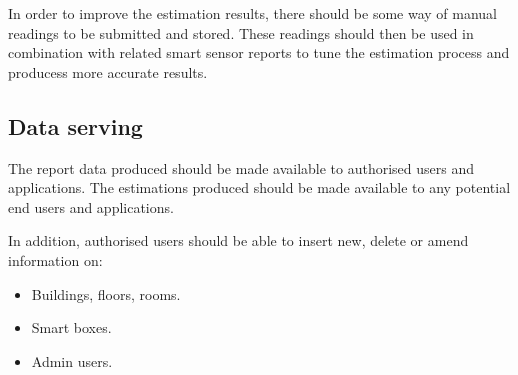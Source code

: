 \documentclass{l4proj}
\begin{document}
In order to improve the estimation results, there should be some way of manual readings to be submitted and stored. These readings should then be used in combination with related smart sensor reports to tune the estimation process and producess more accurate results.

\subsection{Data serving}
The report data produced should be made available to authorised users and applications.
The estimations produced should be made available to any potential end users and applications.

In addition, authorised users should be able to insert new, delete or amend information on:
\begin{itemize}  
  \item Buildings, floors, rooms.
  \item Smart boxes.
  \item Admin users.
\end{itemize}
\end{document}
